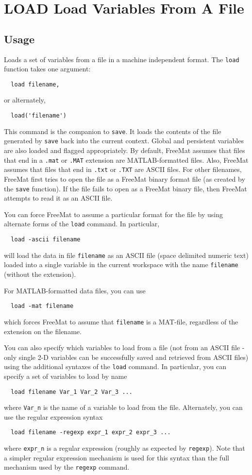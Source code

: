 \section{LOAD Load Variables From A File}

\subsection{Usage}

Loads a set of variables from a file in a machine independent format.
The \verb|load| function takes one argument:
\begin{verbatim}
  load filename,
\end{verbatim}
or alternately,
\begin{verbatim}
  load('filename')
\end{verbatim}
This command is the companion to \verb|save|.  It loads the contents of the
file generated by \verb|save| back into the current context.  Global and 
persistent variables are also loaded and flagged appropriately.  By
default, FreeMat assumes that files that end in a \verb|.mat| or \verb|.MAT|
extension are MATLAB-formatted files.  Also, FreeMat assumes that 
files that end in \verb|.txt| or \verb|.TXT| are ASCII files. 
For other filenames, FreeMat first tries to open the file as a 
FreeMat binary format file (as created by the \verb|save| function).  
If the file fails to open as a FreeMat binary file, then FreeMat 
attempts to read it as an ASCII file.  

You can force FreeMat to assume a particular format for the file
by using alternate forms of the \verb|load| command.  In particular,
\begin{verbatim}
  load -ascii filename
\end{verbatim}
will load the data in file \verb|filename| as an ASCII file (space delimited
numeric text) loaded into a single variable in the current workspace
with the name \verb|filename| (without the extension).

For MATLAB-formatted data files, you can use
\begin{verbatim}
  load -mat filename
\end{verbatim}
which forces FreeMat to assume that \verb|filename| is a MAT-file, regardless
of the extension on the filename.

You can also specify which variables to load from a file (not from 
an ASCII file - only single 2-D variables can be successfully saved and
retrieved from ASCII files) using the additional syntaxes of the \verb|load|
command.  In particular, you can specify a set of variables to load by name
\begin{verbatim}
  load filename Var_1 Var_2 Var_3 ...
\end{verbatim}
where \verb|Var_n| is the name of a variable to load from the file.  
Alternately, you can use the regular expression syntax
\begin{verbatim}
  load filename -regexp expr_1 expr_2 expr_3 ...
\end{verbatim}
where \verb|expr_n| is a regular expression (roughly as expected by \verb|regexp|).
Note that a simpler regular expression mechanism is used for this syntax
than the full mechanism used by the \verb|regexp| command.

